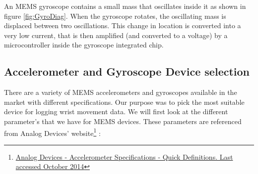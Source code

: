 An MEMS gyroscope contains a small mass that oscillates inside it as shown in figure \ref{fig:GyroDiag}. When the gyroscope rotates, the oscillating mass is displaced between two oscillations. This change in location is converted into a very low current, that is then amplified (and converted to a voltage) by a microcontroller inside the gyroscope integrated chip.

\subsection{Accelerometer and Gyroscope Device selection}
There are a variety of MEMS accelerometers and gyroscopes available in the market with different specifications. Our purpose was to pick the most suitable device for logging wrist movement data. We will first look at the different parameter's that we have for MEMS devices. These parameters are referenced from Analog Devices' website\footnote{\href{http://www.analog.com/en/content/td_accelerometer_specifications_definitions/fca.html}{Analog Devices - Accelerometer Specifications - Quick Definitions. Last accessed October 2014}} :

